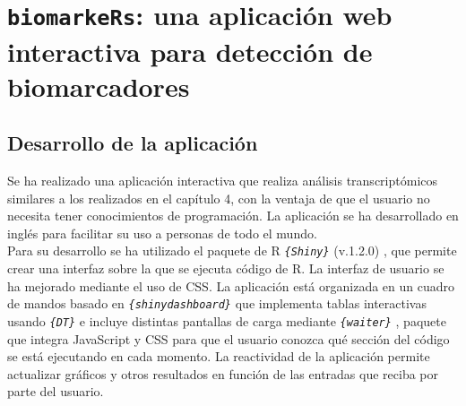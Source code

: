 \chapter{\texttt{biomarkeRs}: una aplicación web interactiva para detección de biomarcadores}

\section{Desarrollo de la aplicación}

Se ha realizado una aplicación interactiva que realiza análisis transcriptómicos similares a los realizados en el capítulo 4, con la ventaja de que el usuario no necesita tener conocimientos de programación. La aplicación se ha desarrollado en inglés para facilitar su uso a personas de todo el mundo.\\

Para su desarrollo se ha utilizado el paquete de R \textit{\texttt{\{Shiny\}}} (v.1.2.0) \cite{Chang2020}, que permite crear una interfaz sobre la que se ejecuta código de R. La interfaz de usuario se ha mejorado mediante el uso de CSS. La aplicación está organizada en un cuadro de mandos basado en \textit{\texttt{\{shinydashboard\}}} \cite{Chang2018} que implementa tablas interactivas usando \textit{\texttt{\{DT\}}} \cite{Xie2020} e incluye distintas pantallas de carga mediante \textit{\texttt{\{waiter\}}} \cite{Coene2020}, paquete que integra JavaScript y CSS para que el usuario conozca qué sección del código se está ejecutando en cada momento. La reactividad de la aplicación permite actualizar gráficos y otros resultados en función de las entradas que reciba por parte del usuario. \\

